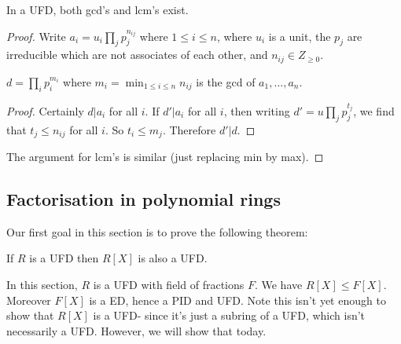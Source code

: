 \documentclass[egregdoesnotlikesansseriftitles,a4paper]{scrartcl}
\begin{document}
\begin{proposition}
       In a UFD, both gcd's and lcm's exist.
       \begin{proof}
            Write $a_i = u_i \prod_{j}p_{j}^{n_{ij}}$ where $1 \leq i \leq n$, where $u_{i}$ is a unit, the $p_{j}$ are irreducible which are not associates of each other, and $n_{ij}\in Z_{\geq 0}$. 
            \begin{claim}
                  $d=\prod_{i}{p_{i}^{m_i}}$ where $m_i=\min_{1 \leq i \leq n} n_{ij}$ is the gcd of $a_1 , \ldots, a_n$.
            \end{claim}
            \begin{proof}
                  Certainly $d| a_{i}$ for all $i$. If $d'|a_{i}$ for all $i$, then writing $d'=u \prod_j p_{j}^{t_{j}} $, we find that $t_{j}\leq n_{ij}$ for all $i$. So $t_i \leq m_j$. Therefore $d' |d$. 
            \end{proof}
            The argument for lcm's is similar (just replacing min by max).
     \end{proof}
\end{proposition}
\newpage
\subsection{Factorisation in polynomial rings}
\begin{goal}
      Our first goal in this section is to prove the following theorem:
\end{goal}
\begin{theorem}\label{polyUFD}
       If $R$ is a UFD then $R[X]$ is also a UFD.
\end{theorem}
In this section, $R$ is a UFD with field of fractions $F$. We have $R[X] \leq F[X]$. Moreover $F[X]$ is a ED, hence a PID and UFD. Note this isn't yet enough to show that $R[X]$ is a UFD- since it's just a subring of a UFD, which isn't necessarily a UFD. However, we will show that today.
\end{document}
